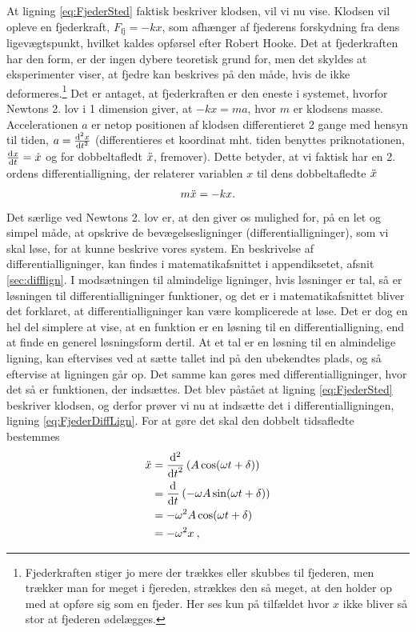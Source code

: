 At ligning \eqref{eq:FjederSted} faktisk beskriver klodsen, vil vi nu vise. Klodsen vil opleve en fjederkraft, $F_\mathrm{fj} = -kx$, som afhænger af fjederens forskydning fra dens ligevægtspunkt, hvilket kaldes  opførsel efter Robert Hooke. Det at fjederkraften har den form, er der ingen dybere teoretisk grund for, men det skyldes at eksperimenter viser, at fjedre kan beskrives på den måde, hvis de ikke deformeres.\footnote{Fjederkraften stiger jo mere der trækkes eller skubbes til fjederen, men trækker man for meget i fjereden, strækkes den så meget, at den holder op med at opføre sig som en fjeder. Her ses kun på tilfældet hvor $x$ ikke bliver så stor at fjederen ødelægges.} Det er antaget, at fjederkraften er den eneste i systemet, hvorfor Newtons 2. lov i 1 dimension giver, at $-kx = ma$, hvor $m$ er klodsens masse. Accelerationen $a$ er netop positionen af klodsen differentieret 2 gange med hensyn til tiden, $a = \dif[2]{t}{x}$ (differentieres et koordinat mht. tiden benyttes priknotationen, $\dif{t}{x} = \dt{x}$ og for dobbeltafledt $\ddt{x}$, fremover). Dette betyder, at vi faktisk har en 2. ordens differentialligning, der relaterer variablen $x$ til dens dobbeltafledte $\ddt{x}$
%
\begin{align} \label{eq:FjederDiffLign}
	m\ddt{x} = -kx.
\end{align}
%
Det særlige ved Newtons 2. lov er, at den giver os mulighed for, på en let og simpel måde, at opskrive de bevægelsesligninger (differentialligninger), som vi skal løse, for at kunne beskrive vores system. En beskrivelse af differentialligninger, kan findes i matematikafsnittet i appendiksetet, afsnit \ref{sec:difflign}. I modsætningen til almindelige ligninger, hvis løsninger er tal, så er løsningen til differentialligninger funktioner, og det er i matematikafsnittet bliver det forklaret, at differentialligninger kan være komplicerede at løse. Det er dog en hel del simplere at vise, at en funktion er en løsning til en differentialligning, end at finde en generel løsningsform dertil. At et tal er en løsning til en almindelige ligning, kan eftervises ved at sætte tallet ind på den ubekendtes plads, og så eftervise at ligningen går op. Det samme kan gøres med differentialligninger, hvor det så er funktionen, der indsættes. Det blev påstået at ligning \eqref{eq:FjederSted} beskriver klodsen, og derfor prøver vi nu at indsætte det i differentialligningen, ligning \eqref{eq:FjederDiffLign}. For at gøre det skal den dobbelt tidsafledte bestemmes
%
\begin{equation}
\begin{aligned}
	\ddt{x} &=\dif[2]{t}{}\left(A\cos(\omega t +\delta) \right) \\
	&= \dif{t}{}\left( -\omega A \sin(\omega t + \delta) \right) \\
	&= -\omega ^2 A \cos(\omega t + \delta ) \\
	&= -\omega^2x \: ,
\end{aligned}
\end{equation}
